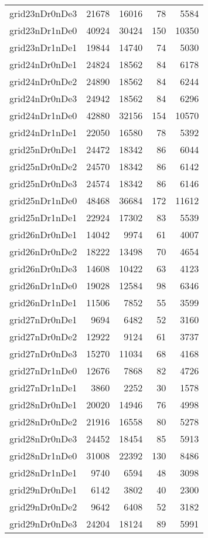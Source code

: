 \begin{tabular}{lrrrr}
grid23nDr0nDe3 & 21678 & 16016 & 78 & 5584 \\
grid23nDr1nDe0 & 40924 & 30424 & 150 & 10350 \\
grid23nDr1nDe1 & 19844 & 14740 & 74 & 5030 \\
grid24nDr0nDe1 & 24824 & 18562 & 84 & 6178 \\
grid24nDr0nDe2 & 24890 & 18562 & 84 & 6244 \\
grid24nDr0nDe3 & 24942 & 18562 & 84 & 6296 \\
grid24nDr1nDe0 & 42880 & 32156 & 154 & 10570 \\
grid24nDr1nDe1 & 22050 & 16580 & 78 & 5392 \\
grid25nDr0nDe1 & 24472 & 18342 & 86 & 6044 \\
grid25nDr0nDe2 & 24570 & 18342 & 86 & 6142 \\
grid25nDr0nDe3 & 24574 & 18342 & 86 & 6146 \\
grid25nDr1nDe0 & 48468 & 36684 & 172 & 11612 \\
grid25nDr1nDe1 & 22924 & 17302 & 83 & 5539 \\
grid26nDr0nDe1 & 14042 & 9974 & 61 & 4007 \\
grid26nDr0nDe2 & 18222 & 13498 & 70 & 4654 \\
grid26nDr0nDe3 & 14608 & 10422 & 63 & 4123 \\
grid26nDr1nDe0 & 19028 & 12584 & 98 & 6346 \\
grid26nDr1nDe1 & 11506 & 7852 & 55 & 3599 \\
grid27nDr0nDe1 & 9694 & 6482 & 52 & 3160 \\
grid27nDr0nDe2 & 12922 & 9124 & 61 & 3737 \\
grid27nDr0nDe3 & 15270 & 11034 & 68 & 4168 \\
grid27nDr1nDe0 & 12676 & 7868 & 82 & 4726 \\
grid27nDr1nDe1 & 3860 & 2252 & 30 & 1578 \\
grid28nDr0nDe1 & 20020 & 14946 & 76 & 4998 \\
grid28nDr0nDe2 & 21916 & 16558 & 80 & 5278 \\
grid28nDr0nDe3 & 24452 & 18454 & 85 & 5913 \\
grid28nDr1nDe0 & 31008 & 22392 & 130 & 8486 \\
grid28nDr1nDe1 & 9740 & 6594 & 48 & 3098 \\
grid29nDr0nDe1 & 6142 & 3802 & 40 & 2300 \\
grid29nDr0nDe2 & 9642 & 6408 & 52 & 3182 \\
grid29nDr0nDe3 & 24204 & 18124 & 89 & 5991 \\

\end{tabular}
